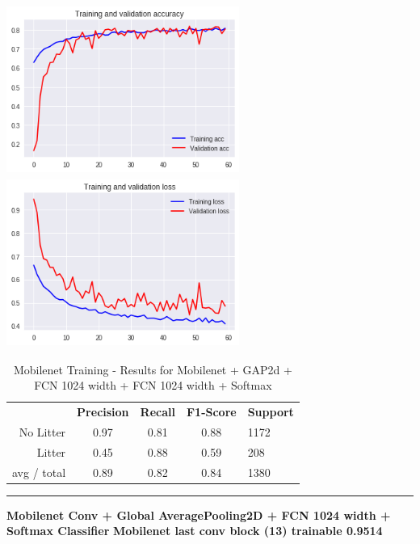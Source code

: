 \documentclass{IEEEtran}
\begin{document}
\includegraphics[width=3in,height=2.18in]{mobile/mobilenet-img011.png} 
\includegraphics[width=3in,height=2.18in]{mobile/mobilenet-img012.png} 

\begin{table}[ht]
\centering
\caption{Mobilenet Training - Results for Mobilenet + GAP2d + FCN 1024 width + FCN 1024 width + Softmax}
\label{mobilenet1}
\begin{tabular}{rcccl}
\textbf{}   & \textbf{Precision} & \textbf{Recall} & \textbf{F1-Score} & \textbf{Support} \\
No Litter   & 0.97 &0.81 & 0.88 & 1172 \\
Litter      & 0.45 &0.88 & 0.59 & 208 \\
avg / total & 0.89 &0.82 & 0.84 & 1380 \\
\end{tabular}
\begin{center}\noindent\rule{10cm}{0.4pt}\end{center}
\end{table}

\bigskip


\bigskip


\bigskip


\bigskip


\bigskip

\textbf{Mobilenet Conv + Global AveragePooling2D + FCN 1024 width + Softmax Classifier}\newline
\textbf{Mobilenet last conv block (13) trainable 0.9514}
\end{document}
